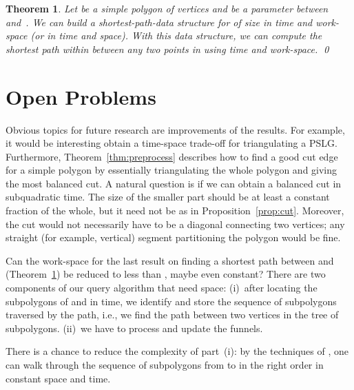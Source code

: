 \documentclass[11pt,a4paper]{article}
\newtheorem{theorem}{Theorem}[section]
\newcommand{\pslg}{PSLG}
\begin{document}
\begin{theorem}
\label{path-with-space}
  Let  be a simple polygon of  vertices and  be a parameter
  between  and~. We can build a shortest-path-data structure for 
  of size  in  time and  work-space (or in  time and space).
  With this data structure, we can compute the shortest path
  within  between any two points in  using
   time and  work-space.
\qed
\end{theorem}

\section{Open Problems}

Obvious topics for future research are improvements of
the results. For example, it would be interesting obtain a time-space trade-off
for triangulating a \pslg. Furthermore, Theorem~\ref{thm:preprocess} describes
how to find a good cut edge for a simple polygon by essentially triangulating
the whole polygon and giving the most balanced cut. A natural question is if we
can obtain a balanced cut in subquadratic time. The size of the smaller part should
be at least a constant fraction of the whole, but it need not be  as in
Proposition~\ref{prop:cut}.  Moreover, the
cut would not necessarily have to be a diagonal connecting two
vertices; any straight (for example, vertical) segment partitioning
the polygon would be fine.

Can the work-space for the last result on finding a shortest path
between  and  (Theorem~\ref{path-with-space}) be reduced to less
than , maybe even constant?  There are two components of our
query algorithm that need  space:
(i)~after locating the subpolygons of  and  in  time, we
 identify and store the sequence of subpolygons traversed by
the path, i.e., we find the path between two vertices in the
tree of subpolygons.
(ii)~we have to process and update the funnels.

There is a chance to reduce the complexity of part~(i): by the
techniques of \cite[Theorem~2]{AsanoMuWa11}, one can walk through the
sequence of subpolygons from  to  in the right order in constant
space and  time.



\end{document}
